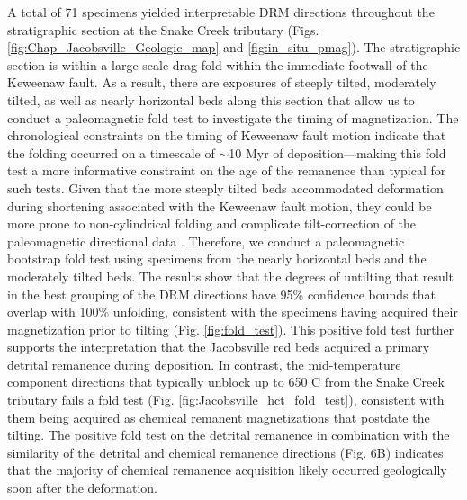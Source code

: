 A total of 71 specimens yielded interpretable DRM directions throughout the stratigraphic section at the Snake Creek tributary (Figs. \ref{fig:Chap_Jacobsville_Geologic_map} and \ref{fig:in_situ_pmag}). The stratigraphic section is within a large-scale drag fold within the immediate footwall of the Keweenaw fault. As a result, there are exposures of steeply tilted, moderately tilted, as well as nearly horizontal beds along this section that allow us to conduct a paleomagnetic fold test to investigate the timing of magnetization. The chronological constraints on the timing of Keweenaw fault motion indicate that the folding occurred on a timescale of $\sim$10 Myr of deposition---making this fold test a more informative constraint on the age of the remanence than typical for such tests. Given that the more steeply tilted beds accommodated deformation during shortening associated with the Keweenaw fault motion, they could be more prone to non-cylindrical folding and complicate tilt-correction of the paleomagnetic directional data \cite[e.g.][]{Pueyo2003a, Nabavi2021a}. Therefore, we conduct a paleomagnetic bootstrap fold test \citep{Tauxe1994a} using specimens from the nearly horizontal beds and the moderately tilted beds. The results show that the degrees of untilting that result in the best grouping of the DRM directions have 95\% confidence bounds that overlap with 100\% unfolding, consistent with the specimens having acquired their magnetization prior to tilting (Fig. \ref{fig:fold_test}). This positive fold test further supports the interpretation that the Jacobsville red beds acquired a primary detrital remanence during deposition. In contrast, the mid-temperature component directions that typically unblock up to 650 \textdegree C from the Snake Creek tributary fails a fold test (Fig. \ref{fig:Jacobsville_hct_fold_test}), consistent with them being acquired as chemical remanent magnetizations that postdate the tilting. The positive fold test on the detrital remanence in combination with the similarity of the detrital and chemical remanence directions (Fig. 6B) indicates that the majority of chemical remanence acquisition likely occurred geologically soon after the deformation.

